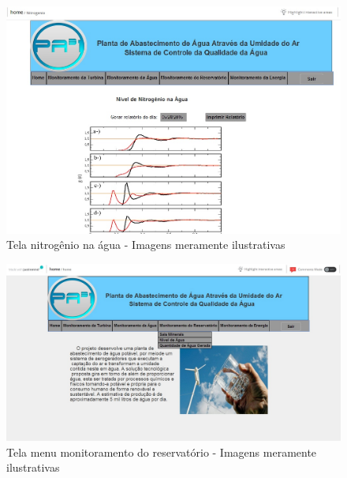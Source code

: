 \begin{center}
\begin{figure}[!ht]
\centering
\includegraphics[scale=0.5]{figuras/10}
\caption[Tela nitrogênio na água]{Tela nitrogênio na água - Imagens meramente ilustrativas}
\label{tela_nitrogenio_na_agua}
\end{figure}
\clearpage

\begin{figure}[!ht]
\centering
\includegraphics[scale=0.45]{figuras/menu_monitoramento_do_reservatorio}
\caption[Tela menu monitoramento do reservatório]{Tela menu monitoramento do reservatório - Imagens meramente ilustrativas}
\label{menu_monitoramento_do_reservatorio}
\end{figure}



\end{center}
